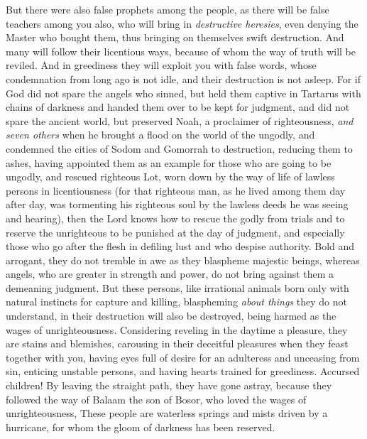 \begin{biblechapter} %
 But there were also false prophets among the people, as there will be false teachers among you also, who will bring in \textit{destructive heresies}, even denying the Master who bought them, thus bringing on themselves swift destruction.
\verse And many will follow their licentious ways, because of whom the way of truth will be reviled.
\verse And in greediness they will exploit you with false words, whose condemnation from long ago is not idle, and their destruction is not asleep.
\verse For if God did not spare the angels who sinned, but held them captive in Tartarus with chains of darkness and handed them over to be kept for judgment,
\verse and did not spare the ancient world, but preserved Noah, a proclaimer of righteousness, \textit{and seven others} when he brought a flood on the world of the ungodly,
\verse and condemned the cities of Sodom and Gomorrah to destruction, reducing them to ashes, having appointed them as an example for those who are going to be ungodly,
\verse and rescued righteous Lot, worn down by the way of life of lawless persons in licentiousness
\verse (for that righteous man, as he lived among them day after day, was tormenting his righteous soul by the lawless deeds he was seeing and hearing),
\verse then the Lord knows how to rescue the godly from trials and to reserve the unrighteous to be punished at the day of judgment,
\verse and especially those who go after the flesh in defiling lust and who despise authority.
\verse Bold and arrogant, they do not tremble in awe as they blaspheme majestic beings,
\verse whereas angels, who are greater in strength and power, do not bring against them a demeaning judgment.
\verse But these persons, like irrational animals born only with natural instincts for capture and killing, blaspheming \textit{about things} they do not understand, in their destruction will also be destroyed,
\verse being harmed as the wages of unrighteousness. Considering reveling in the daytime a pleasure, they are stains and blemishes, carousing in their deceitful pleasures when they feast together with you,
\verse having eyes full of desire for an adulteress and unceasing from sin, enticing unstable persons, and having hearts trained for greediness. Accursed children!
\verse By leaving the straight path, they have gone astray, because they followed the way of Balaam the son of Bosor, who loved the wages of unrighteousness,
\verse These people are waterless springs and mists driven by a hurricane, for whom the gloom of darkness has been reserved.

\end{biblechapter}
